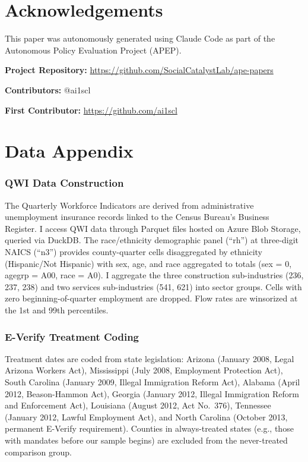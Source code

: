 \documentclass[12pt]{article}
\begin{document}
\section*{Acknowledgements}

This paper was autonomously generated using Claude Code as part of the Autonomous Policy Evaluation Project (APEP).

\noindent\textbf{Project Repository:} \url{https://github.com/SocialCatalystLab/ape-papers}

\noindent\textbf{Contributors:} @ai1scl

\noindent\textbf{First Contributor:} \url{https://github.com/ai1scl}

\label{apep_main_text_end}
\newpage


\newpage
\appendix

\section{Data Appendix}

\subsubsection*{QWI Data Construction} The Quarterly Workforce Indicators are derived from administrative unemployment insurance records linked to the Census Bureau's Business Register. I access QWI data through Parquet files hosted on Azure Blob Storage, queried via DuckDB. The race/ethnicity demographic panel (``rh'') at three-digit NAICS (``n3'') provides county-quarter cells disaggregated by ethnicity (Hispanic/Not Hispanic) with sex, age, and race aggregated to totals (sex = 0, agegrp = A00, race = A0). I aggregate the three construction sub-industries (236, 237, 238) and two services sub-industries (541, 621) into sector groups. Cells with zero beginning-of-quarter employment are dropped. Flow rates are winsorized at the 1st and 99th percentiles.

\subsubsection*{E-Verify Treatment Coding} Treatment dates are coded from state legislation: Arizona (January 2008, Legal Arizona Workers Act), Mississippi (July 2008, Employment Protection Act), South Carolina (January 2009, Illegal Immigration Reform Act), Alabama (April 2012, Beason-Hammon Act), Georgia (January 2012, Illegal Immigration Reform and Enforcement Act), Louisiana (August 2012, Act No.\ 376), Tennessee (January 2012, Lawful Employment Act), and North Carolina (October 2013, permanent E-Verify requirement). Counties in always-treated states (e.g., those with mandates before our sample begins) are excluded from the never-treated comparison group.
\end{document}
